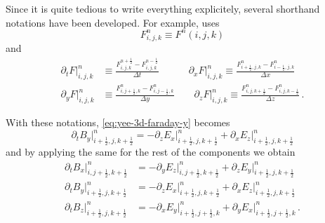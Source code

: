 \documentclass[12pt, class=report, crop=false]{standalone}
\begin{document}
Since it is quite tedious to write everything explicitely, several shorthand
notations have been developed. For example, \textcite{lehe_electromagneticparticleincell_2018}
uses
\[
F^n_{i,j,k} \equiv F^n(i,j,k)
\]
and
\begin{align*}
  \partial_t F \rvert^n_{i,j,k} &\equiv \frac{F^{n+\frac{1}{2}}_{i,j,k} - F^{n-\frac{1}{2}}_{i,j,k}}{\Delta t} \qquad\quad
  \partial_x F \rvert^n_{i,j,k} \equiv \frac{F^n_{i+\frac{1}{2},j,k} - F^n_{i-\frac{1}{2},j,k}}{\Delta x} \\
  \partial_y F \rvert^n_{i,j,k} &\equiv \frac{F^n_{i,j+\frac{1}{2},k} - F^n_{i,j-\frac{1}{2},k}}{\Delta y} \qquad
  \partial_z F \rvert^n_{i,j,k} \equiv \frac{F^n_{i,j,k+\frac{1}{2}} - F^n_{i,j,k-\frac{1}{2}}}{\Delta z} \,.
\end{align*}

With these notations, \cref{eq:yee-3d-faraday-y} becomes
\[
\partial_t B_y \rvert^n_{i+\frac{1}{2},j,k+\frac{1}{2}} =
  -\partial_z E_x \rvert^n_{i+\frac{1}{2},j,k+\frac{1}{2}}
  +\partial_x E_z \rvert^n_{i+\frac{1}{2},j,k+\frac{1}{2}}
\]
and by applying the same for the rest of the components we obtain
\begin{align*}
  \partial_t B_x \rvert^n_{i,j+\frac{1}{2},k+\frac{1}{2}} &=
  -\partial_y E_z \rvert^n_{i,j+\frac{1}{2},k+\frac{1}{2}}
  +\partial_z E_y \rvert^n_{i+\frac{1}{2},j,k+\frac{1}{2}} \\
  \partial_t B_y \rvert^n_{i+\frac{1}{2},j,k+\frac{1}{2}} &=
  -\partial_z E_x \rvert^n_{i+\frac{1}{2},j,k+\frac{1}{2}}
  +\partial_x E_z \rvert^n_{i+\frac{1}{2},j,k+\frac{1}{2}} \\
  \partial_t B_z \rvert^n_{i+\frac{1}{2},j,k+\frac{1}{2}} &=
  -\partial_x E_y \rvert^n_{i+\frac{1}{2},j+\frac{1}{2},k}
  +\partial_y E_x \rvert^n_{i+\frac{1}{2},j+\frac{1}{2},k} \,.
\end{align*}
\end{document}
